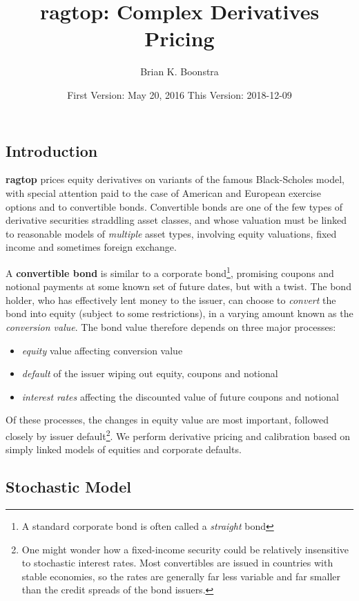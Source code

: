 \documentclass[]{article}
\title{ragtop: Complex Derivatives Pricing}
\author{Brian K. Boonstra}
\date{First Version: May 20, 2016 This Version: 2018-12-09}
\providecommand{\tightlist}{%
  \setlength{\itemsep}{0pt}\setlength{\parskip}{0pt}}
\let\rmarkdownfootnote\footnote%
\def\footnote{\protect\rmarkdownfootnote}
\begin{document}
\maketitle

{
\setcounter{tocdepth}{2}
\tableofcontents
}
\subsection{Introduction}\label{introduction}

\textbf{ragtop} prices equity derivatives on variants of the famous
Black-Scholes model, with special attention paid to the case of American
and European exercise options and to convertible bonds. Convertible
bonds are one of the few types of derivative securities straddling asset
classes, and whose valuation must be linked to reasonable models of
\emph{multiple} asset types, involving equity valuations, fixed income
and sometimes foreign exchange.

A \textbf{convertible bond} is similar to a corporate bond\footnote{A
  standard corporate bond is often called a \emph{straight} bond},
promising coupons and notional payments at some known set of future
dates, but with a twist. The bond holder, who has effectively lent money
to the issuer, can choose to \emph{convert} the bond into equity
(subject to some restrictions), in a varying amount known as the
\emph{conversion value}. The bond value therefore depends on three major
processes:

\begin{itemize}
\tightlist
\item
  \emph{equity} value affecting conversion value
\item
  \emph{default} of the issuer wiping out equity, coupons and notional
\item
  \emph{interest rates} affecting the discounted value of future coupons
  and notional
\end{itemize}

Of these processes, the changes in equity value are most important,
followed closely by issuer default\footnote{One might wonder how a
  fixed-income security could be relatively insensitive to stochastic
  interest rates. Most convertibles are issued in countries with stable
  economies, so the rates are generally far less variable and far
  smaller than the credit spreads of the bond issuers.}. We perform
derivative pricing and calibration based on simply linked models of
equities and corporate defaults.

\subsection{Stochastic Model}\label{stochastic-model}
\end{document}
